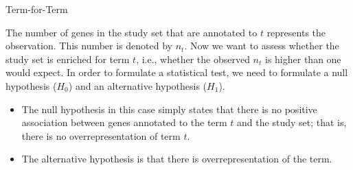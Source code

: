 \documentclass{beamer}
\begin{document}
\begin{frame}{Term-for-Term}

 The
 number of genes in the study
set that are annotated to $t$ represents the observation. This number
is denoted by $n_t$. Now we want to assess whether the study set is
enriched for term $t$, i.e., whether the observed $n_t$ is higher than
one would expect. In order to formulate a statistical test, we need to
formulate a null hypothesis ($H_0$) and an alternative hypothesis
($H_1$). 
\begin{itemize}
 \item The null hypothesis in this case simply states that there is
no positive association between genes annotated to the term $t$ and
the study set; that is, there is no overrepresentation of term
$t$.
\item The alternative hypothesis is that there is overrepresentation of
the term.
\end{itemize}

\end{frame}
\end{document}
